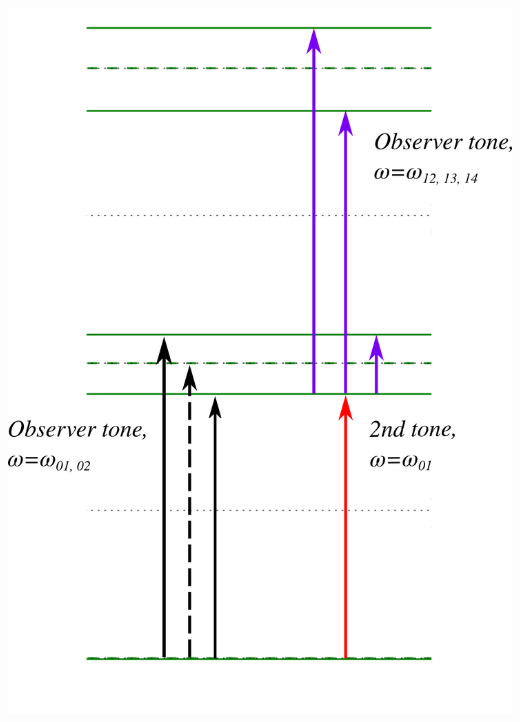 \documentclass[aspectratio=169, 13pt]{beamer}
\begin{document}
{\begin{columns}[c]
\vspace{0.2cm}
\includegraphics[height=0.75\textheight]{2tone}

\end{columns}
}
\end{document}
